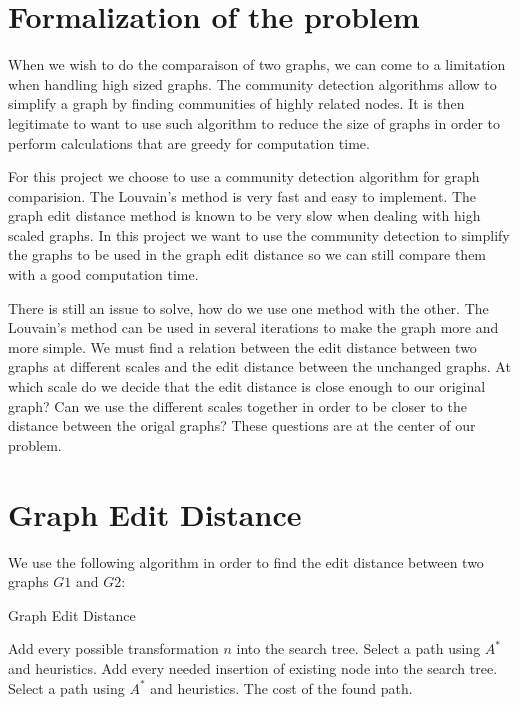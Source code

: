 \documentclass[UTF8, twoside]{EPURapport}
\begin{document}
\chapter{Formalization of the problem}

	\hspace{4ex}When we wish to do the comparaison of two graphs, we can come to a limitation when handling high sized graphs. The community detection algorithms allow to simplify a graph by finding communities of highly related nodes. It is then legitimate to want to use such algorithm to reduce the size of graphs in order to perform calculations that are greedy for computation time.
	
	For this project we choose to use a community detection algorithm for graph comparision. The Louvain's method is very fast and easy to implement. The graph edit distance method is known to be very slow when dealing with high scaled graphs. In this project we want to use the community detection to simplify the graphs to be used in the graph edit distance so we can still compare them with a good computation time.
	
	There is still an issue to solve, how do we use one method with the other. The Louvain's method can be used in several iterations to make the graph more and more simple. We must find a relation between the edit distance between two graphs at different scales and the edit distance between the unchanged graphs. At which scale do we decide that the edit distance is close enough to our original graph? Can we use the different scales together in order to be closer to the distance between the origal graphs? These questions are at the center of our problem.
	
\chapter{Graph Edit Distance}

	\hspace{4ex}We use the following algorithm in order to find the edit distance between two graphs $G1$ and $G2$:
	
\begin{algorithm}
  \caption{Graph Edit Distance}
  \begin{algorithmic}[1]
      \Repeat
		  \State Add every possible transformation $n$ into the search tree.
		  \State Select a path using $A^*$ and heuristics.
		\EndFor
		  \State Add every needed insertion of existing node into the search tree.
		  \State Select a path using $A^*$ and heuristics.
		\EndFor
	  \State \Return The cost of the found path.
  \end{algorithmic}
\end{algorithm}
\end{document}
